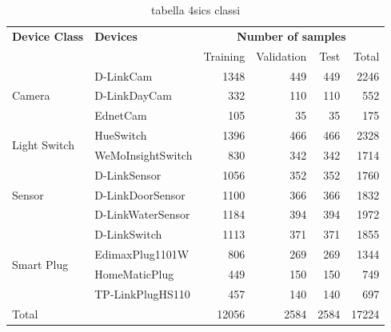 \begin{table}
\centering
\begin{tabular}{llrrrr}
\toprule
\textbf{Device Class} & \textbf{Devices} & \multicolumn{4}{c}{\textbf{Number of samples}} \\
& & Training & Validation & Test & Total \\
\midrule
\multirow{3}{*}{Camera}  & D-LinkCam     & 1348 & 449 & 449 & 2246  \\
                         & D-LinkDayCam  & 332 & 110 & 110 & 552  \\
                         & EdnetCam      & 105 & 35 & 35 & 175  \\
\midrule
\multirow{2}{*}{Light Switch} & HueSwitch & 1396 & 466 & 466 & 2328 \\
                             &  WeMoInsightSwitch & 830 & 342 & 342 & 1714  \\
\midrule
\multirow{3}{*}{Sensor} &  D-LinkSensor  & 1056 & 352 & 352 & 1760 \\
                         & D-LinkDoorSensor  & 1100 & 366 & 366 & 1832  \\
                         & D-LinkWaterSensor  & 1184 & 394 & 394 & 1972  \\
\midrule
\multirow{4}{*}{Smart Plug}& D-LinkSwitch  & 1113 & 371 & 371 & 1855 \\
                          & EdimaxPlug1101W & 806 & 269 & 269 & 1344  \\
                          & HomeMaticPlug & 449 & 150 & 150 & 749  \\
                          & TP-LinkPlugHS110 & 457 & 140 & 140 & 697  \\
\midrule
\midrule
Total & & 12056 & 2584 & 2584 & 17224 \\
\bottomrule
\end{tabular}
\caption{tabella 4sics classi}
\label{tab:iotdev}
\end{table}


